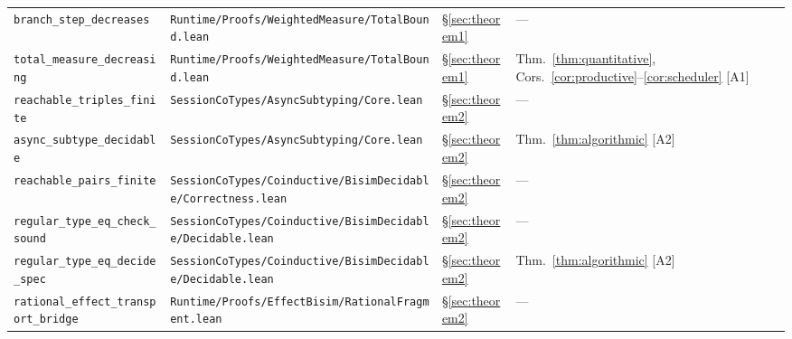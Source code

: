 \documentclass[a4paper,10pt,twocolumn,english]{article}
\numberwithin{equation}{section}
\theoremstyle{paperdef}
\theoremstyle{paperplain}
\theoremstyle{paperdef}
\theoremstyle{paperremark}
\begin{document}
\begin{table}[H]
\begin{tabularx}{\textwidth}{L{0.27\textwidth}L{0.37\textwidth}L{0.06\textwidth}>{\raggedright\arraybackslash}X}
		\texttt{branch\_step\_decreases}                                & \texttt{Runtime/\allowbreak Proofs/\allowbreak WeightedMeasure/\allowbreak}\mbox{\texttt{TotalBound.lean}}                        & \S\ref{sec:theorem1}     & ---                                                                               \\
		\texttt{total\_measure\_\allowbreak decreasing}                 & \texttt{Runtime/\allowbreak Proofs/\allowbreak WeightedMeasure/\allowbreak}\mbox{\texttt{TotalBound.lean}}                        & \S\ref{sec:theorem1}     & Thm.~\ref{thm:quantitative}, Cors.~\ref{cor:productive}--\ref{cor:scheduler} [A1] \\
		\texttt{reachable\_triples\_\allowbreak finite}                 & \texttt{SessionCoTypes/\allowbreak AsyncSubtyping/\allowbreak}\mbox{\texttt{Core.lean}}                                           & \S\ref{sec:theorem2}     & ---                                                                               \\
		\texttt{async\_subtype\_\allowbreak decidable}                  & \texttt{SessionCoTypes/\allowbreak AsyncSubtyping/\allowbreak}\mbox{\texttt{Core.lean}}                                           & \S\ref{sec:theorem2}     & Thm.~\ref{thm:algorithmic} [A2]                                                   \\
		\texttt{reachable\_pairs\_\allowbreak finite}                   & \texttt{SessionCoTypes/\allowbreak Coinductive/\allowbreak BisimDecidable/\allowbreak}\mbox{\texttt{Correctness.lean}}            & \S\ref{sec:theorem2}     & ---                                                                               \\
		\texttt{regular\_type\_eq\_\allowbreak check\_sound}            & \texttt{SessionCoTypes/\allowbreak Coinductive/\allowbreak BisimDecidable/\allowbreak}\mbox{\texttt{Decidable.lean}}              & \S\ref{sec:theorem2}     & ---                                                                               \\
		\texttt{regular\_type\_eq\_\allowbreak decide\_spec}            & \texttt{SessionCoTypes/\allowbreak Coinductive/\allowbreak BisimDecidable/\allowbreak}\mbox{\texttt{Decidable.lean}}              & \S\ref{sec:theorem2}     & Thm.~\ref{thm:algorithmic} [A2]                                                   \\
		\texttt{rational\_effect\_\allowbreak transport\_bridge}        & \texttt{Runtime/\allowbreak Proofs/\allowbreak EffectBisim/\allowbreak}\mbox{\texttt{RationalFragment.lean}}                      & \S\ref{sec:theorem2}     & ---                                                                               \\

\end{tabularx}
\end{table}
\end{document}
